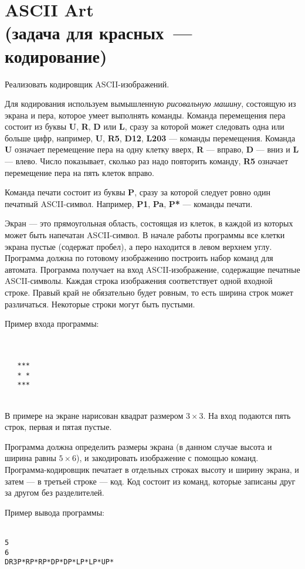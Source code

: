 \documentclass[a4paper,10pt]{article}
\begin{document}
\section*{ASCII Art\\
(задача для красных~--- кодирование)}

Реализовать кодировщик ASCII-изображений.

Для кодирования используем вымышленную {\em рисовальную машину}, состоящую из экрана и пера, которое умеет выполнять команды.
Команда перемещения пера состоит из буквы \textbf{U}, \textbf{R}, \textbf{D} или \textbf{L}, сразу за которой может следовать одна или больше цифр, например, \textbf{U}, \textbf{R5}, \textbf{D12}, \textbf{L203} — команды перемещения.
Команда \textbf{U} означает перемещение пера на одну клетку вверх, \textbf{R} — вправо, \textbf{D} — вниз и \textbf{L} — влево.
Число показывает, сколько раз надо повторить команду, \textbf{R5} означает перемещение пера на пять клеток вправо.

Команда печати состоит из буквы \textbf{P}, сразу за которой следует ровно один печатный ASCII-символ.
Например, \textbf{P1}, \textbf{Pa}, \textbf{P*} — команды печати.

Экран — это прямоугольная область, состоящая из клеток, в каждой из которых может быть напечатан ASCII-символ.
В начале работы программы все клетки экрана пустые (содержат пробел), а перо находится в левом верхнем углу.
Программа должна по готовому изображению построить набор команд для автомата.
Программа получает на вход ASCII-изображение, содержащие печатные ASCII-символы.
Каждая строка изображения соответствует одной входной строке.
Правый край не обязательно будет ровным, то есть ширина строк может различаться.
Некоторые строки могут быть пустыми.

Пример входа программы:

\texttt{ \\
\\
\ \ \ ***\\
\ \ \ *\ *\\
\ \ \ ***\\
\\
}

В примере на экране нарисован квадрат размером $3\times 3$. На вход подаются пять строк, первая и пятая пустые.

Программа должна определить размеры экрана (в данном случае высота и ширина равны $5\times 6$), и закодировать изображение с помощью команд. Программа-кодировщик печатает в отдельных строках высоту и ширину экрана, и затем — в третьей строке — код. Код состоит из команд, которые записаны друг за другом без разделителей.

Пример вывода программы:

\texttt{ \\
5\\
6\\
DR3P*RP*RP*DP*DP*LP*LP*UP*}
\end{document}
